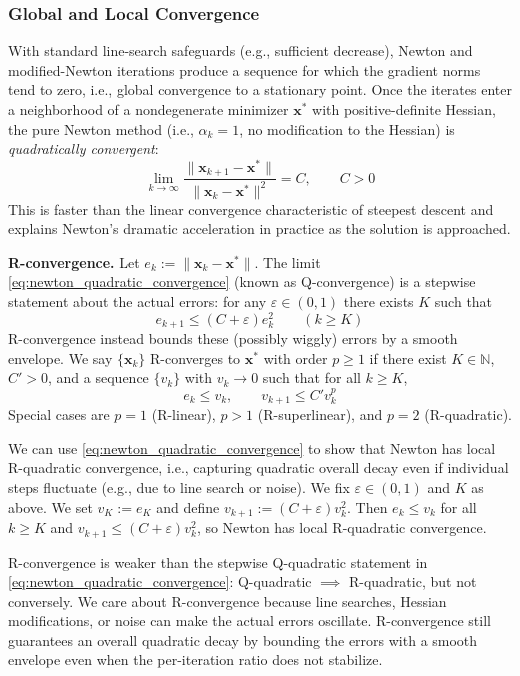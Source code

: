\subsubsection{Global and Local Convergence}
With standard line-search safeguards (e.g., sufficient decrease), Newton and modified-Newton iterations produce a sequence for which the gradient norms tend to zero, i.e., global convergence to a stationary point. Once the iterates enter a neighborhood of a nondegenerate minimizer $\mathbf{x}^\ast$ with positive-definite Hessian, the pure Newton method (i.e., $\alpha_k=1$, no modification to the Hessian) is \emph{quadratically convergent}:
\begin{equation}
\lim_{k\to\infty}\frac{\|\mathbf{x}_{k+1}-\mathbf{x}^\ast\|}{\|\mathbf{x}_k-\mathbf{x}^\ast\|^2}=C,\qquad C>0
\label{eq:newton_quadratic_convergence}
\end{equation}
This is faster than the linear convergence characteristic of steepest descent and explains Newton's dramatic acceleration in practice as the solution is approached.  

\textbf{R-convergence.}\quad
Let $e_k:=\|\mathbf{x}_k-\mathbf{x}^\ast\|$. The limit \autoref{eq:newton_quadratic_convergence} (known as Q-convergence) is a stepwise statement about the actual errors: for any $\varepsilon\in(0,1)$ there exists $K$ such that
\begin{equation}
e_{k+1}\le (C+\varepsilon)e_k^{2}\qquad(k\ge K)
\end{equation}
R-convergence instead bounds these (possibly wiggly) errors by a smooth envelope. We say $\{\mathbf{x}_k\}$ R-converges to $\mathbf{x}^\ast$ with order $p\ge 1$ if there exist $K\in\mathbb{N}$, $C'>0$, and a sequence $\{v_k\}$ with $v_k\to 0$ such that for all $k\ge K$,
\begin{equation}
e_k\le v_k,\qquad v_{k+1}\le C' v_k^{p}
\end{equation}
Special cases are $p=1$ (R-linear), $p>1$ (R-superlinear), and $p=2$ (R-quadratic).

We can use \autoref{eq:newton_quadratic_convergence} to show that Newton has local R-quadratic convergence, i.e., capturing quadratic overall decay even if individual steps fluctuate (e.g., due to line search or noise). We fix $\varepsilon\in(0,1)$ and $K$ as above. We set $v_K:=e_K$ and define $v_{k+1}:=(C+\varepsilon) v_k^{2}$. Then $e_k\le v_k$ for all $k\ge K$ and $v_{k+1}\le (C+\varepsilon)v_k^{2}$, so Newton has local R-quadratic convergence.

R-convergence is weaker than the stepwise Q-quadratic statement in \autoref{eq:newton_quadratic_convergence}: Q-quadratic $\implies$ R-quadratic, but not conversely. We care about R-convergence because line searches, Hessian modifications, or noise can make the actual errors oscillate. R-convergence still guarantees an overall quadratic decay by bounding the errors with a smooth envelope even when the per-iteration ratio does not stabilize.

